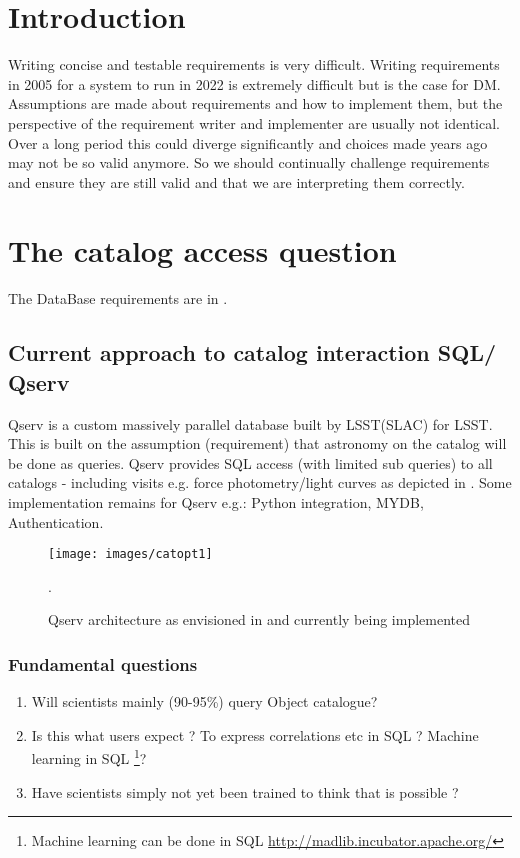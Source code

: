 \section{Introduction} \label{sec:intro}
 Writing concise and testable requirements is very difficult.
 Writing requirements in 2005 for a system to run in 2022 is extremely difficult but is the case for DM.
Assumptions are made about requirements and how to implement them, but
the perspective of the requirement writer and implementer are usually not identical.
Over a long period this could diverge significantly and  choices made years ago may not be so valid anymore.
So we should continually challenge requirements and ensure they are still valid and that we are interpreting them correctly.


\section{The catalog  access  question}\label{sec:cat}
The DataBase requirements are in .

\subsection{Current approach to catalog interaction SQL/ Qserv}
\label{sec:qserv}
Qserv is a custom massively parallel database built  by LSST(SLAC) for LSST.
This is built on the assumption (requirement) that astronomy on the catalog will be done as queries.
Qserv provides SQL access (with limited sub queries) to all catalogs - including visits e.g. force photometry/light curves as depicted in .
Some implementation remains for Qserv e.g.: Python integration, MYDB, Authentication.

\begin{figure}
\begin{center}
 \texttt{[image: images/catopt1]}
\caption{Qserv architecture as envisioned in   and currently being implemented \label{fig:catopt1}}.
\end{center}
\end{figure}

\subsubsection{Fundamental questions}
\begin{enumerate}
\item Will scientists mainly (90-95\%) query Object catalogue?
\item  Is this what users expect ? To express correlations etc in SQL ? Machine learning in SQL
\footnote{Machine learning  can be done in SQL \url{http://madlib.incubator.apache.org/}}?
\item Have scientists  simply not yet been trained to think that is possible ?
\end{enumerate}

